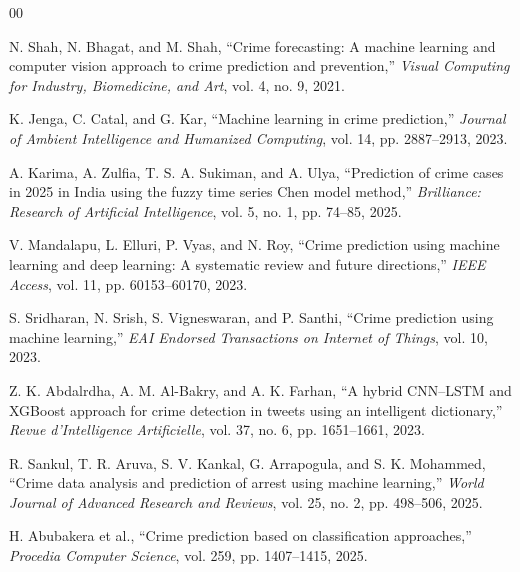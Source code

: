 \documentclass[conference]{IEEEtran}
\begin{document}
\begin{thebibliography}{00}

 N. Shah, N. Bhagat, and M. Shah, ``Crime forecasting: A machine learning and computer vision approach to crime prediction and prevention,'' \textit{Visual Computing for Industry, Biomedicine, and Art}, vol. 4, no. 9, 2021.

 K. Jenga, C. Catal, and G. Kar, ``Machine learning in crime prediction,'' \textit{Journal of Ambient Intelligence and Humanized Computing}, vol. 14, pp. 2887--2913, 2023.

 A. Karima, A. Zulfia, T. S. A. Sukiman, and A. Ulya, ``Prediction of crime cases in 2025 in India using the fuzzy time series Chen model method,'' \textit{Brilliance: Research of Artificial Intelligence}, vol. 5, no. 1, pp. 74--85, 2025.

 V. Mandalapu, L. Elluri, P. Vyas, and N. Roy, ``Crime prediction using machine learning and deep learning: A systematic review and future directions,'' \textit{IEEE Access}, vol. 11, pp. 60153--60170, 2023.

 S. Sridharan, N. Srish, S. Vigneswaran, and P. Santhi, ``Crime prediction using machine learning,'' \textit{EAI Endorsed Transactions on Internet of Things}, vol. 10, 2023.

 Z. K. Abdalrdha, A. M. Al-Bakry, and A. K. Farhan, ``A hybrid CNN--LSTM and XGBoost approach for crime detection in tweets using an intelligent dictionary,'' \textit{Revue d'Intelligence Artificielle}, vol. 37, no. 6, pp. 1651--1661, 2023.

 R. Sankul, T. R. Aruva, S. V. Kankal, G. Arrapogula, and S. K. Mohammed, ``Crime data analysis and prediction of arrest using machine learning,'' \textit{World Journal of Advanced Research and Reviews}, vol. 25, no. 2, pp. 498--506, 2025.

 H. Abubakera et al., ``Crime prediction based on classification approaches,'' \textit{Procedia Computer Science}, vol. 259, pp. 1407--1415, 2025.

\end{thebibliography}
\end{document}
